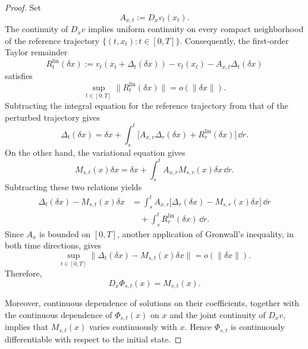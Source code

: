 \documentclass[12pt,a4paper,oneside]{book}
\begin{document}
\begin{proof}
Set
\begin{equation*}
    A_{x,t}:=D_xv_t(x_t).
\end{equation*}
The continuity of $D_xv$ implies uniform continuity on every compact neighborhood of the reference trajectory $\{(t,x_t):t\in[0,T]\}$.
Consequently, the first-order Taylor remainder
\begin{equation*}
    R_t^{\mathrm{lin}}(\delta x) := v_t(x_t+\Delta_t(\delta x))-v_t(x_t) - A_{x,t}\Delta_t(\delta x)
\end{equation*}
satisfies
\begin{equation*}
    \sup_{t\in[0,T]}\|R_t^{\mathrm{lin}}(\delta x)\| = o(\|\delta x\|).
\end{equation*}
Subtracting the integral equation for the reference trajectory from that of the perturbed trajectory gives
\begin{equation*}
    \Delta_t(\delta x) = \delta x+\int_s^t \bigl[A_{x,r}\Delta_r(\delta x)+R_r^{\mathrm{lin}}(\delta x)\bigr]\,\dd r.
\end{equation*}
On the other hand, the variational equation gives
\begin{equation*}
    M_{s,t}(x)\delta x = \delta x+\int_s^t A_{x,r}M_{s,r}(x)\delta x\,\dd r.
\end{equation*}
Subtracting these two relations yields
\begin{equation*}
    \begin{aligned}
        \Delta_t(\delta x)-M_{s,t}(x)\delta x &= \int_s^t A_{x,r} \bigl[\Delta_r(\delta x)-M_{s,r}(x)\delta x\bigr]\,\dd r\\
        & \quad+ \int_s^t R_r^{\mathrm{lin}}(\delta x)\,\dd r.
    \end{aligned}
\end{equation*}
Since $A_x$ is bounded on $[0,T]$, another application of Gronwall's inequality, in both time directions, gives
\begin{equation*}
    \sup_{t\in[0,T]} \|\Delta_t(\delta x)-M_{s,t}(x)\delta x\| = o(\|\delta x\|).
\end{equation*}
Therefore,
\begin{equation*}
    D_x\Phi_{s,t}(x)=M_{s,t}(x).
\end{equation*}

Moreover, continuous dependence of solutions on their coefficients, together with the continuous dependence of $\Phi_{s,t}(x)$
on $x$ and the joint continuity of $D_xv$, implies that $M_{s,t}(x)$ varies continuously with $x$. Hence $\Phi_{s,t}$ is
continuously differentiable with respect to the initial state.


\end{proof}
\end{document}
